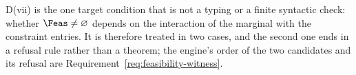 
D(vii) is the one target condition that is not a typing or a finite syntactic
check: whether $\Feas\ne\varnothing$ depends on the interaction of the marginal
with the constraint entries. It is therefore treated in two cases, and the
second one ends in a refusal rule rather than a theorem; the engine's order of
the two candidates and its refusal are Requirement~\ref{req:feasibility-witness}.

